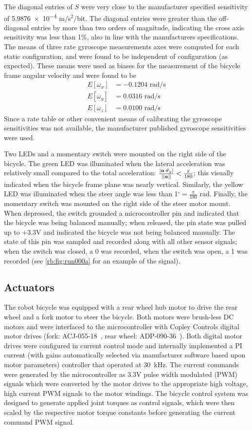 The diagonal entries of $S$ were very close to the manufacturer specified
sensitivity of \num{5.9876e-4} m/s$^2$/bit. The diagonal entries were greater than
the off-diagonal entries by more than two orders of magnitude, indicating the
cross axis sensitivity was less than 1\%, also in line with the manufacturers
specifications. The means of three rate gyroscope measurements axes were
computed for each static configuration, and were found to be independent of
configuration (as expected). These means were used as biases for the
measurement of the bicycle frame angular velocity and were found to be
\begin{align}
  E[\omega_x] &= -0.1204\text{ rad/s}\\
  E[\omega_y] &=  0.0316 \text{ rad/s}\\
  E[\omega_z] &=  0.0100 \text{ rad/s}
\end{align}
Since a rate table or other convenient means of calibrating the gyroscope
sensitivities was not available, the manufacturer published gyroscope
sensitivities were used.

Two LEDs and a momentary switch were mounted on the right side of the bicycle.
The green LED was illuminated when the lateral acceleration was relatively
small compared to the total acceleration: $\frac{|\boldsymbol{a} \cdot
\hat{\boldsymbol{r}}_{y}|}{||\boldsymbol{a}||} < \frac{\pi}{180}$; this visually indicated when the
bicycle frame plane was nearly vertical. Similarly, the yellow LED was
illuminated when the steer angle was less than 1$^\circ = \frac{\pi}{180}$ rad.
Finally, the momentary switch was mounted on the right side of the steer motor
mount. When depressed, the switch grounded a microcontroller pin and indicated
that the bicycle was being balanced manually; when released, the pin state was
pulled up to +3.3V and indicated the bicycle was not being balanced manually.
The state of this pin was sampled and recorded along with all other sensor
signals; when the switch was closed, a 0 was recorded, when the switch was
open, a 1 was recorded (see \autoref{rb:fig:run000a} for an example of the
signal).

\subsection{Actuators} \label{rb:subsec:actuators}
The robot bicycle was equipped with a rear wheel hub motor to drive the rear
wheel and a fork motor to steer the bicycle. Both motors were brush-less DC
motors and were interfaced to the microcontroller with Copley Controls digital
motor drives (fork: ACJ-055-18~\cite{CopleyACJ}, rear wheel:
ADP-090-36~\cite{CopleyADP}). Both digital motor drives were configured in
current control mode and internally implemented a PI current (with gains
automatically selected via manufacturer software based upon motor parameters)
controller that operated at \SI{30}{\kHz}. The current commands were generated by the
microcontroller as 3.3V pulse width modulated (PWM) signals which were
converted by the motor drives to the appropriate high voltage, high current PWM
signals to the motor windings. The bicycle control system was designed to
generate applied joint torques as control signals, which were then scaled by
the respective motor torque constants before generating the current command PWM
signal.

